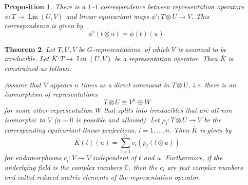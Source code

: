 \documentclass[12pt, a4paper]{article}
\theoremstyle{plain}
\newtheorem{pro}{Proposition}[section]
\newtheorem{thm}[pro]{Theorem}
\theoremstyle{definition}
\theoremstyle{remark}
\newcommand{\C}{\mathds{C}}
\DeclareMathOperator{\lin}{Lin}
\begin{document}
\begin{pro}\label{correspondence}
There is a $1$–$1$ correspondence between representation operators $\phi: T \to \lin(U,V)$ and linear equivariant maps $\phi': T \otimes U \to V$. This correspondence is given by
\begin{equation*}
\phi'(t \otimes u) = \phi(t)(u).
\end{equation*}
\end{pro}

\begin{thm}\label{theorem}
Let $T, U, V$ be $G$-representations, of which $V$ is assumed to be irreducible. Let $\overline{K}: T \to \lin(U, V)$ be a representation operator. Then $\overline{K}$ is constrained as follows:

Assume that $V$ appears $n$ times as a direct summand in $T \otimes U$, i.e. there is an isomorphism of representations
\begin{equation*}
T \otimes U \cong V^n \oplus W
\end{equation*}
for some other representation $W$ that splits into irreducibles that are all non-isomorphic to $V$ ($n = 0$ is possible and allowed). Let $\rho_i: T \otimes U \to V$ be the corresponding equivariant linear projections, $i = 1, \dots, n$. Then $\overline{K}$ is given by
\begin{equation*}
\overline{K}(t)(u) = \sum_{i = 1}^{n}c_i \left( p_i(t \otimes u) \right)
\end{equation*}
for endomorphisms $c_i: V \to V$ independent of $t$ and $u$. Furthermore, if the underlying field is the complex numbers $\C$, then the $c_i$ are just complex numbers and called reduced matrix elements of the representation operator. 
\end{thm}
\end{document}
